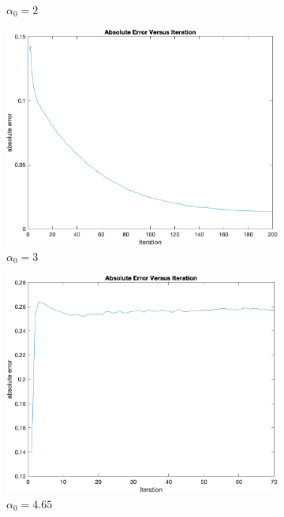 \documentclass{article}
\begin{document}
\begin{figure}[htp]
\begin{subfigure}{.5\textwidth}
		\caption{$ \alpha_0 = 2 $}
	\end{subfigure}
	\begin{subfigure}{.5\textwidth}
		\centering
		\includegraphics[width=0.9\linewidth]{figs/Q3/Iteration/M1000_a3.png}
		\caption{$ \alpha_0 = 3 $}
	\end{subfigure}
\begin{subfigure}{.5\textwidth}
	\centering
	\includegraphics[width=0.9\linewidth]{figs/Q3/Iteration/M1000_a465.png}
	\caption{$ \alpha_0 = 4.65 $}
\end{subfigure}
\begin{subfigure}{.5\textwidth}
	\centering

\end{subfigure}
\end{figure}
\end{document}
